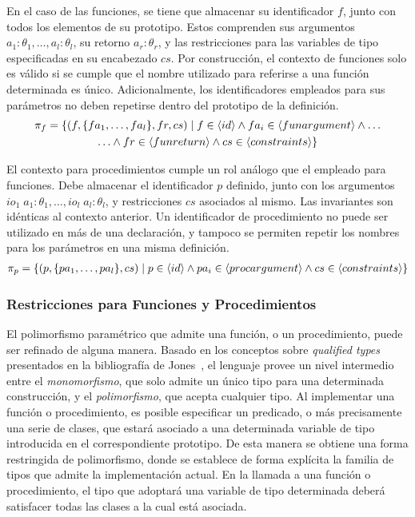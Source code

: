 En el caso de las funciones, se tiene que almacenar su identificador $f$, junto con todos los elementos de su prototipo.
Estos comprenden sus argumentos $a_1: \theta_1, \ldots, a_l: \theta_l$, su retorno $a_r: \theta_r$, y las restricciones para las variables de tipo especificadas en su encabezado $cs$.
Por construcción, el contexto de funciones solo es válido si se cumple que el nombre utilizado para referirse a una función determinada es único.
Adicionalmente, los identificadores empleados para sus parámetros no deben repetirse dentro del prototipo de la definición.
\begin{multline*}
\pi_{f} =
\{
(f, \{ fa_1, \ldots, fa_l \}, fr, cs) \mid
f \in \langle id \rangle
\wedge
fa_i \in \langle funargument \rangle
\wedge
\ldots
\\
\ldots
\wedge
fr \in \langle funreturn \rangle
\wedge
cs \in \langle constraints \rangle
\}
\end{multline*}

El contexto para procedimientos cumple un rol análogo que el empleado para funciones.
Debe almacenar el identificador $p$ definido, junto con los argumentos $io_1 \; a_1: \theta_1, \ldots, io_l \; a_l: \theta_l$, y restricciones $cs$ asociados al mismo.
Las invariantes son idénticas al contexto anterior.
Un identificador de procedimiento no puede ser utilizado en más de una declaración, y tampoco se permiten repetir los nombres para los parámetros en una misma definición.
\begin{multline*}
\pi_{p} =
\{
(p, \{ pa_1, \ldots, pa_l \}, cs) \mid
p \in \langle id \rangle
\wedge
pa_i \in \langle procargument \rangle
\wedge
cs \in \langle constraints \rangle
\}
\end{multline*}

\subsubsection{Restricciones para Funciones y Procedimientos}

El polimorfismo paramétrico que admite una función, o un procedimiento, puede ser refinado de alguna manera.
Basado en los conceptos sobre \textit{qualified types} presentados en la bibliografía de Jones~\cite{Jones}, el lenguaje provee un nivel intermedio entre el \textit{monomorfismo}, que solo admite un único tipo para una determinada construcción, y el \textit{polimorfismo}, que acepta cualquier tipo.
Al implementar una función o procedimiento, es posible especificar un predicado, o más precisamente una serie de clases, que estará asociado a una determinada variable de tipo introducida en el correspondiente prototipo.
De esta manera se obtiene una forma restringida de polimorfismo, donde se establece de forma explícita la familia de tipos que admite la implementación actual.
En la llamada a una función o procedimiento, el tipo que adoptará una variable de tipo determinada deberá satisfacer todas las clases a la cual está asociada.

